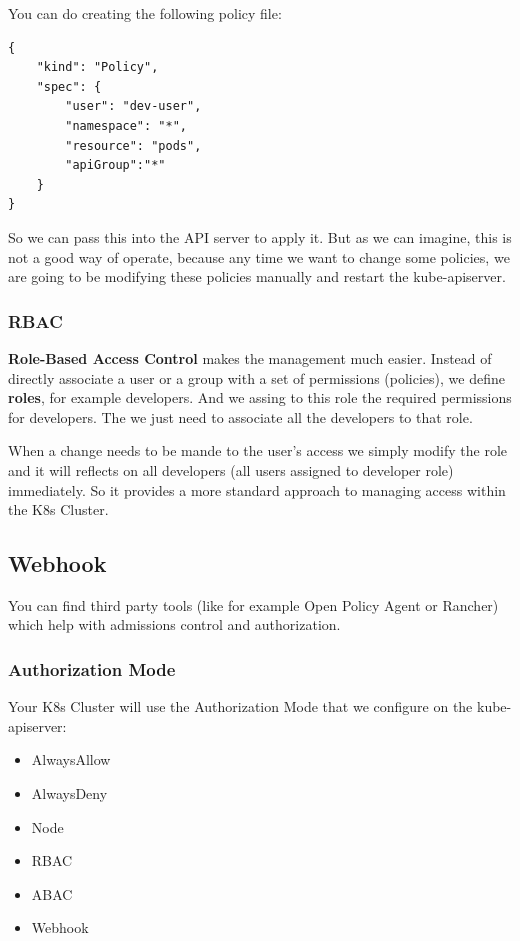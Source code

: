 \documentclass{article}
\newenvironment{codetemplate}[1][]{%
  \mybasecolorbox[#1]
  \itshape
}{%
  \endmybasecolorbox
}
\begin{document}
You can do creating the following policy file:
\begin{codetemplate}{}
\begin{verbatim}
{
    "kind": "Policy", 
    "spec": {
        "user": "dev-user", 
        "namespace": "*", 
        "resource": "pods", 
        "apiGroup":"*"
    }
}
\end{verbatim}
\end{codetemplate}

So we can pass this into the API server to apply it. But as we can imagine, this is not a good way of operate, because any time we want to
change some policies, we are going to be modifying these policies manually and restart the kube-apiserver.

\subsubsection{RBAC}
\textbf{Role-Based Access Control} makes the management much easier. Instead of directly associate a user or a group with a set of permissions (policies), we define \textbf{roles}, for example developers. And we assing to this role the required permissions for developers. The we just need to associate all the developers to that role.

When a change needs to be mande to the user's access we simply modify the role
and it will reflects on all developers (all users assigned to developer role) immediately. So it provides a more standard approach to managing access within the K8s Cluster.

\subsection{Webhook}
You can find third party tools (like for example Open Policy Agent or Rancher) which help with admissions control and authorization.

\subsubsection{Authorization Mode}
Your K8s Cluster will use the Authorization Mode that we configure on the kube-apiserver:
\begin{itemize}
    \item AlwaysAllow
    \item AlwaysDeny
    \item Node
    \item RBAC
    \item ABAC
    \item Webhook
\end{itemize}
\end{document}
